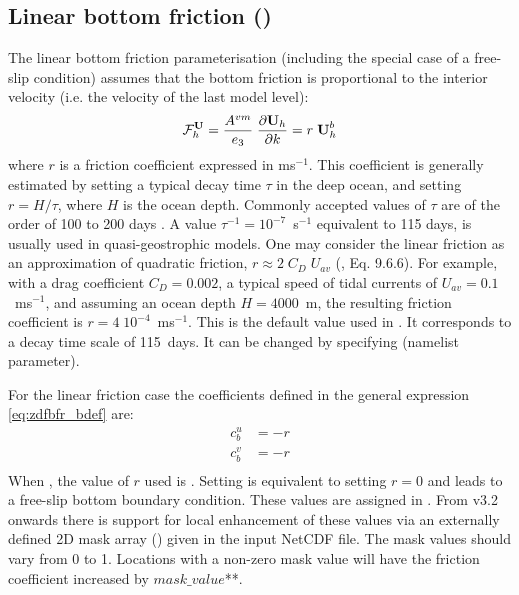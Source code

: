 \documentclass[../tex_main/NEMO_manual]{subfiles}
\begin{document}
\subsection{Linear bottom friction (\protect{})}
\label{subsec:ZDF_bfr_linear}

The linear bottom friction parameterisation (including the special case 
of a free-slip condition) assumes that the bottom friction 
is proportional to the interior velocity (i.e. the velocity of the last 
model level):
\begin{equation} \label{eq:zdfbfr_linear}
{\cal F}_h^\textbf{U} = \frac{A^{vm}}{e_3} \; \frac{\partial \textbf{U}_h}{\partial k} = r \; \textbf{U}_h^b
\end{equation}
where $r$ is a friction coefficient expressed in ms$^{-1}$. 
This coefficient is generally estimated by setting a typical decay time 
$\tau$ in the deep ocean, 
and setting $r = H / \tau$, where $H$ is the ocean depth. Commonly accepted 
values of $\tau$ are of the order of 100 to 200 days \citep{Weatherly_JMR84}. 
A value $\tau^{-1} = 10^{-7}$~s$^{-1}$ equivalent to 115 days, is usually used 
in quasi-geostrophic models. One may consider the linear friction as an 
approximation of quadratic friction, $r \approx 2\;C_D\;U_{av}$ (\citet{Gill1982}, 
Eq. 9.6.6). For example, with a drag coefficient $C_D = 0.002$, a typical speed 
of tidal currents of $U_{av} =0.1$~m\;s$^{-1}$, and assuming an ocean depth 
$H = 4000$~m, the resulting friction coefficient is $r = 4\;10^{-4}$~m\;s$^{-1}$. 
This is the default value used in \NEMO. It corresponds to a decay time scale 
of 115~days. It can be changed by specifying  (namelist parameter).

For the linear friction case the coefficients defined in the general 
expression \autoref{eq:zdfbfr_bdef} are: 
\begin{equation} \label{eq:zdfbfr_linbfr_b}
\begin{split}
 c_b^u &= - r\\
 c_b^v &= - r\\
\end{split}
\end{equation}
When , the value of $r$ used is . 
Setting  is equivalent to setting $r=0$ and leads to a free-slip 
bottom boundary condition. These values are assigned in . 
From v3.2 onwards there is support for local enhancement of these values 
via an externally defined 2D mask array () given
in the  input NetCDF file. The mask values should vary from 0 to 1. 
Locations with a non-zero mask value will have the friction coefficient increased 
by $mask\_value$**.
\end{document}
